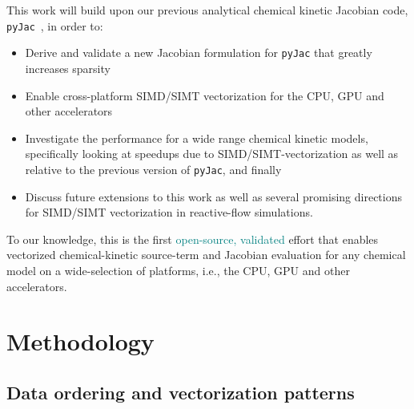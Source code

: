\documentclass[12pt,number,sort&compress,preprint]{elsarticle}
\newcommand{\add}[1]{{\sloppy\textcolor{teal}{#1}}}  %
\begin{document}
This work will build upon our previous analytical chemical kinetic Jacobian code, \texttt{pyJac}~\cite{Niemeyer:2016aa}, in order to:
\begin{itemize}
 \item Derive and validate a new Jacobian formulation for \texttt{pyJac} that greatly increases sparsity
 \item Enable cross-platform SIMD\slash SIMT vectorization for the CPU, GPU and other accelerators
 \item Investigate the performance for a wide range chemical kinetic models, specifically looking at speedups due to SIMD\slash SIMT-vectorization as well as relative to the previous version of \texttt{pyJac}, and finally
 \item Discuss future extensions to this work as well as several promising directions for SIMD\slash SIMT vectorization in reactive-flow simulations.
\end{itemize}
To our knowledge, this is the first \add{open-source, validated} effort that enables vectorized chemical-kinetic source-term and Jacobian evaluation for any chemical model on a wide-selection of platforms, i.e., the CPU, GPU and other accelerators.

\section{Methodology}
\subsection{Data ordering and vectorization patterns}
\label{S:data}
\end{document}
